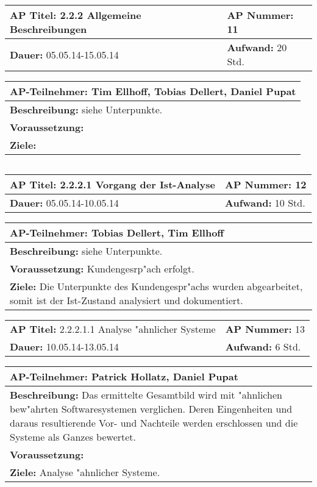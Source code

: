 \begin{verbatim}

\end{verbatim}
\begin{tabular}{|p{7.43cm}|p{7.43cm}|}
\hline
\textbf{AP Titel: }2.2.2 Allgemeine Beschreibungen & \textbf{AP Nummer: }11\\ 
\hline
\textbf{Dauer: }05.05.14-15.05.14& \textbf{Aufwand: }20 Std.\\
\hline
\end{tabular}
\begin{tabular}{|p{15.3cm}|}
\hline
\textbf{AP-Teilnehmer: }Tim Ellhoff, Tobias Dellert, Daniel Pupat\\
\hline
\textbf{Beschreibung: }siehe Unterpunkte.\\
\hline
\textbf{Voraussetzung: }\\
\hline 
\textbf{Ziele: }\\
\hline 
\end{tabular}
\begin{verbatim}

\end{verbatim}
\begin{tabular}{|p{7.43cm}|p{7.43cm}|}
\hline
\textbf{AP Titel: }2.2.2.1 Vorgang der Ist-Analyse & \textbf{AP Nummer: }12\\ 
\hline
\textbf{Dauer: }05.05.14-10.05.14 & \textbf{Aufwand: }10 Std.\\
\hline
\end{tabular}
\begin{tabular}{|p{15.3cm}|}
\hline
\textbf{AP-Teilnehmer: }Tobias Dellert, Tim Ellhoff\\
\hline
\textbf{Beschreibung: }siehe Unterpunkte.\\
\hline
\textbf{Voraussetzung: }Kundengesrp"ach erfolgt.\\
\hline 
\textbf{Ziele: }Die Unterpunkte des Kundengespr"achs wurden abgearbeitet, somit ist der Ist-Zustand analysiert und dokumentiert.\\
\hline 
\end{tabular}

\begin{tabular}{|p{7.43cm}|p{7.43cm}|}
\hline
\textbf{AP Titel: }2.2.2.1.1 Analyse "ahnlicher Systeme& \textbf{AP Nummer: }13\\
\textbf{Dauer: }10.05.14-13.05.14& \textbf{Aufwand: }6 Std.\\
\hline
\end{tabular}
\begin{tabular}{|p{15.3cm}|}
\hline
\textbf{AP-Teilnehmer: }Patrick Hollatz, Daniel Pupat\\
\hline
\textbf{Beschreibung: }Das ermittelte Gesamtbild wird mit "ahnlichen bew"ahrten Softwaresystemen verglichen. Deren Eingenheiten und daraus resultierende Vor- und Nachteile werden erschlossen und die Systeme als Ganzes bewertet.\\
\hline
\textbf{Voraussetzung: }\\
\hline 
\textbf{Ziele: }Analyse "ahnlicher Systeme.\\
\hline 
\end{tabular}

